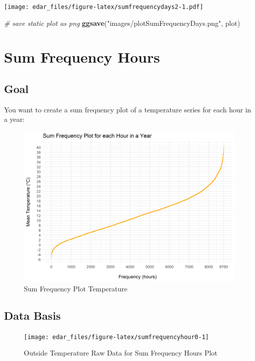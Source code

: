 \documentclass[
  a4paperpaper,
]{book}
\newenvironment{Shaded}{\begin{snugshade}}{\end{snugshade}}
\newcommand{\CommentTok}[1]{\textcolor[rgb]{0.56,0.35,0.01}{\textit{#1}}}
\newcommand{\KeywordTok}[1]{\textcolor[rgb]{0.13,0.29,0.53}{\textbf{#1}}}
\newcommand{\NormalTok}[1]{#1}
\newcommand{\StringTok}[1]{\textcolor[rgb]{0.31,0.60,0.02}{#1}}
\let\oldShaded\Shaded
\let\endoldShaded\endShaded
\renewenvironment{Shaded}{\footnotesize\oldShaded}{\endoldShaded}
\begin{document}
\texttt{[image: edar\_files/figure-latex/sumfrequencydays2-1.pdf]}

\begin{Shaded}
\begin{Highlighting}[]
\CommentTok{# save static plot as png}
\KeywordTok{ggsave}\NormalTok{(}\StringTok{"images/plotSumFrequencyDays.png"}\NormalTok{, plot)}
\end{Highlighting}
\end{Shaded}

\newpage

\hypertarget{sum-frequency-hours}{%
\section{Sum Frequency Hours}\label{sum-frequency-hours}}

\hypertarget{goal-17}{%
\subsection{Goal}\label{goal-17}}

You want to create a sum frequency plot of a temperature series for each hour in a year:

\begin{figure}
\includegraphics[width=0.7\linewidth]{images/plotSumFrequencyHour} \caption{Sum Frequency Plot Temperature}\label{fig:unnamed-chunk-26}
\end{figure}

\hypertarget{data-basis-17}{%
\subsection{Data Basis}\label{data-basis-17}}

\begin{figure}
\texttt{[image: edar\_files/figure-latex/sumfrequencyhour0-1]} \caption{Outside Temperature Raw Data for Sum Frequency Hours Plot}\label{fig:sumfrequencyhour0}
\end{figure}
\end{document}
